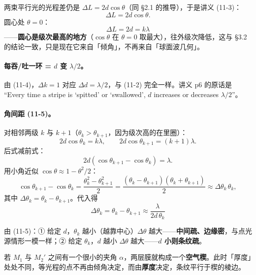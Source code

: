 \documentclass[11pt]{ctexart}
\begin{document}
两束平行光的光程差仍是 \(\Delta L=2d\cos\theta\)（同 §2.1 的推导），于是讲义 (11-3)：
\[
\Delta L=2d\cos\theta .
\tag{11-3}
\]
圆心处 \(\theta=0\)：
\[
\boxed{\;\Delta L=2d=k\lambda\;}
\tag{11-4}
\]
——\textbf{圆心是级次最高的地方}（\(\cos\theta\) 在 \(\theta=0\) 取最大），往外级次降低，这与 §3.2 的结论一致，只是现在它来自「倾角」，不再来自「球面波几何」。

\paragraph{每吞/吐一环 = \(d\) 变 \(\lambda/2\)。}由 (11-4)，\(\Delta k=1\) 对应 \(\Delta d=\lambda/2\)，与 (11-2) 完全一样。讲义 p6 的原话是 ``Every time a stripe is `spitted' or `swallowed', \(d\) increases or decreases \(\lambda/2\)''。

\paragraph{角间距 (11-5)。}对相邻两级 \(k\) 与 \(k+1\)（\(\theta_k>\theta_{k+1}\)，因为级次高的在里圈）：
\[
2d\cos\theta_k=k\lambda,\qquad 2d\cos\theta_{k+1}=(k+1)\lambda .
\]
后式减前式：
\[
2d\left(\cos\theta_{k+1}-\cos\theta_k\right)=\lambda .
\]
用小角近似 \(\cos\theta\approx1-\theta^2/2\)：
\[
\cos\theta_{k+1}-\cos\theta_k=\frac{\theta_k^2-\theta_{k+1}^2}{2}
=\frac{(\theta_k-\theta_{k+1})(\theta_k+\theta_{k+1})}{2}
\approx\Delta\theta_k\,\theta_k ,
\]
其中 \(\Delta\theta_k=\theta_k-\theta_{k+1}\)。代入得
\[
\boxed{\;\Delta\theta_k=\theta_k-\theta_{k+1}\approx\frac{\lambda}{2d\,\theta_k}\;}
\tag{11-5}
\]


由 (11-5)：① 给定 \(d\)，\(\theta_k\) 越小（越靠中心）\(\Delta\theta\) 越大——\textbf{中间疏、边缘密}，与点光源情形一模一样；② 给定 \(\theta_k\)，\(d\) 越小 \(\Delta\theta\) 越大——\textbf{\(d\) 小则条纹疏}。


若 \(M_1\) 与 \(M_2'\) 之间有一个很小的夹角 \(\alpha\)，两层膜就构成一个\textbf{空气楔}。此时「厚度」处处不同，等光程的点不再由倾角决定，而由\textbf{厚度}决定，条纹平行于楔的棱边。
\end{document}
